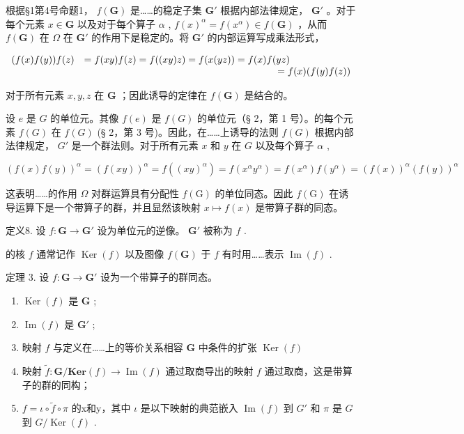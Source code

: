 根据§1第4号命题1， \(f(\mathbf{G})\) 是……的稳定子集 \(\mathbf{G}'\) 根据内部法律规定， \(\mathbf{G}'\) 。对于每个元素 \(x \in \mathbf{G}\) 以及对于每个算子 \(\alpha\) , \(f(x)^{\alpha} = f(x^{\alpha}) \in f(\mathbf{G})\) ，从而 \(f(\mathbf{G})\) 在 \(\Omega\) 在 \(\mathbf{G}'\) 的作用下是稳定的。将 \(\mathbf{G}'\) 的内部运算写成乘法形式，

\[
\begin{array}{r l} (f (x) f (y)) f (z) & = f (x y) f (z) = f ((x y) z) = f (x (y z)) = f (x) f (y z) \\ & \qquad \qquad \qquad \qquad \qquad \qquad \qquad \qquad \qquad \qquad = f (x) (f (y) f (z)) \end{array}
\]

对于所有元素 \(x, y, z\) 在 \(\mathbf{G}\) ；因此诱导的定律在 \(f(\mathbf{G})\) 是结合的。

设 \(e\) 是 \(G\) 的单位元。其像 \(f(e)\) 是 \(f(G)\) 的单位元（§ 2，第 1 号）。的每个元素 \(f(G)\) 在 \(f(G)\) (§ 2，第 3 号)。因此，在……上诱导的法则 \(f(G)\) 根据内部法律规定， \(G'\) 是一个群法则。对于所有元素 \(x\) 和 \(y\) 在 \(G\) 以及每个算子 \(\alpha\) ,

\[
(f (x) f (y)) ^ {\alpha} = (f (x y)) ^ {\alpha} = f ((x y) ^ {\alpha}) = f \left(x ^ {\alpha} y ^ {\alpha}\right) = f \left(x ^ {\alpha}\right) f \left(y ^ {\alpha}\right) = (f (x)) ^ {\alpha} (f (y)) ^ {\alpha}
\]

这表明……的作用 \(\Omega\) 对群运算具有分配性 \(f(\mathrm{G})\) 的单位同态。因此 \(f(\mathrm{G})\) 在诱导运算下是一个带算子的群，并且显然该映射 \(x \mapsto f(x)\) 是带算子群的同态。

定义8. 设 \(f: \mathbf{G} \to \mathbf{G}'\) 设为单位元的逆像。 \(\mathbf{G}'\) 被称为 \(f\) .

的核 \(f\) 通常记作 \(\operatorname{Ker}(f)\) 以及图像 \(f(\mathbf{G})\) 于 \(f\) 有时用……表示 \(\operatorname{Im}(f)\) .

定理 3. 设 \(f: \mathbf{G} \to \mathbf{G}'\) 设为一个带算子的群同态。

\begin{enumerate}
\def\labelenumi{(\alph{enumi})}
\item
  \(\operatorname{Ker}(f)\) 是 \(\mathbf{G}\) ;
\item
  \(\operatorname{Im}(f)\) 是 \(\mathbf{G}'\) ;
\item
  映射 \(f\) 与定义在……上的等价关系相容 \(\mathbf{G}\) 中条件的扩张 \(\operatorname{Ker}(f)\)
\item
  映射 \(\tilde{f}\colon \mathbf{G} / \mathbf{Ker}(f)\to \operatorname {Im}(f)\) 通过取商导出的映射 \(f\) 通过取商，这是带算子的群的同构；
\item
  \(f = \iota \circ \tilde{f} \circ \pi\) 的x和y，其中 \(\iota\) 是以下映射的典范嵌入 \(\operatorname{Im}(f)\) 到 \(G'\) 和 \(\pi\) 是 \(G\) 到 \(G / \operatorname{Ker}(f)\) .
\end{enumerate}

